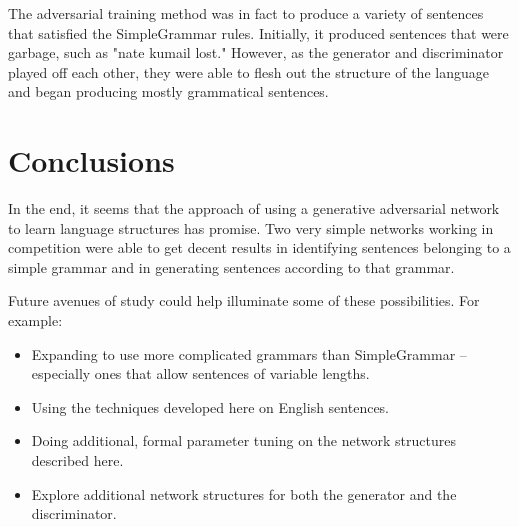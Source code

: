 \documentclass[12pt]{article}
\begin{document}
The adversarial training method was in fact to produce a variety of sentences that satisfied the SimpleGrammar rules. Initially, it produced sentences that were garbage, such as "nate kumail lost." However, as the generator and discriminator played off each other, they were able to flesh out the structure of the language and began producing mostly grammatical sentences.

\section{Conclusions}

In the end, it seems that the approach of using a generative adversarial network to learn language structures has promise. Two very simple networks working in competition were able to get decent results in identifying sentences belonging to a simple grammar and in generating sentences according to that grammar.

Future avenues of study could help illuminate some of these possibilities. For example:

\begin{itemize}
    \item Expanding to use more complicated grammars than SimpleGrammar -- especially ones that allow sentences of variable lengths.
    \item Using the techniques developed here on English sentences.
    \item Doing additional, formal parameter tuning on the network structures described here.
    \item Explore additional network structures for both the generator and the discriminator.
\end{itemize}



\end{document}
